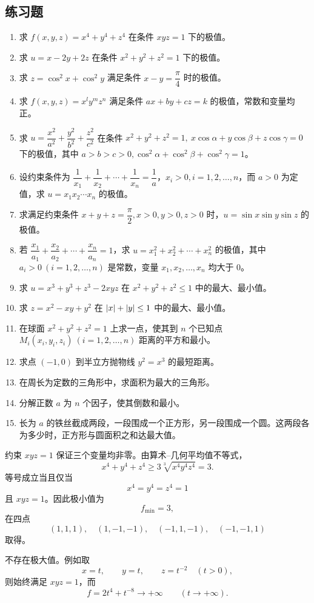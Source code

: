 \subsection{练习题}
\begin{xexercise}
\begin{enumerate}[label=\arabic*.]
  \item 求 $f(x,y,z)=x^4+y^4+z^4$ 在条件 $xyz=1$ 下的极值。
  \item 求 $u=x-2y+2z$ 在条件 $x^2+y^2+z^2=1$ 下的极值。
  \item 求 $z=\cos^2x+\cos^2y$ 满足条件 $x-y=\dfrac\pi4$ 时的极值。
  \item 求 $f(x,y,z)=x^ly^mz^n$ 满足条件 $ax+by+cz=k$ 的极值，常数和变量均正。
  \item 求 $u=\dfrac{x^2}{a^2}+\dfrac{y^2}{b^2}+\dfrac{z^2}{c^2}$ 在条件 $x^2+y^2+z^2=1,\ x\cos\alpha+y\cos\beta+z\cos\gamma=0$ 下的极值，其中 $a>b>c>0,\cos^2\alpha+\cos^2\beta+\cos^2\gamma=1$。
  \item 设约束条件为 $\dfrac1{x_1}+\dfrac1{x_2}+\cdots+\dfrac1{x_n}=\dfrac1a$，$x_i>0,i=1,2,\ldots,n$，而 $a>0$ 为定值，求 $u=x_1x_2\cdots x_n$ 的极值。
  \item 求满足约束条件 $x+y+z=\dfrac\pi2,x>0,y>0,z>0$ 时，$u=\sin x\sin y\sin z$ 的极值。
  \item 若 $\dfrac{x_1}{a_1}+\dfrac{x_2}{a_2}+\cdots+\dfrac{x_n}{a_n}=1$，求 $u=x_1^2+x_2^2+\cdots+x_n^2$ 的极值，其中 $a_i>0\ (i=1,2,\ldots,n)$ 是常数，变量 $x_1,x_2,\ldots,x_n$ 均大于 $0$。
  \item 求 $u=x^3+y^3+z^3-2xyz$ 在 $x^2+y^2+z^2\le1$ 中的最大、最小值。
  \item 求 $z=x^2-xy+y^2$ 在 $\lvert x\rvert+\lvert y\rvert\le1$ 中的最大、最小值。
  \item 在球面 $x^2+y^2+z^2=1$ 上求一点，使其到 $n$ 个已知点 $M_i(x_i,y_i,z_i)\ (i=1,2,\ldots,n)$ 距离的平方和最小。
  \item 求点 $(-1,0)$ 到半立方抛物线 $y^2=x^3$ 的最短距离。
  \item 在周长为定数的三角形中，求面积为最大的三角形。
  \item 分解正数 $a$ 为 $n$ 个因子，使其倒数和最小。
  \item 长为 $a$ 的铁丝截成两段，一段围成一个正方形，另一段围成一个圆。这两段各为多少时，正方形与圆面积之和达最大值。
\end{enumerate}
\end{xexercise}
\begin{xsolution}
约束 $xyz=1$ 保证三个变量均非零。由算术--几何平均值不等式，
\[
  x^4+y^4+z^4
  \ge3\sqrt[3]{x^4y^4z^4}
  =3.
\]
等号成立当且仅当
\[
  x^4=y^4=z^4=1
\]
且 $xyz=1$。因此极小值为
\[
  f_{\min}=3,
\]
在四点
\[
  (1,1,1),\quad(1,-1,-1),\quad(-1,1,-1),\quad(-1,-1,1)
\]
取得。

不存在极大值。例如取
\[
  x=t,\qquad y=t,\qquad z=t^{-2}\quad(t>0),
\]
则始终满足 $xyz=1$，而
\[
  f=2t^4+t^{-8}\to+\infty\qquad(t\to+\infty).
\]
\end{xsolution}

